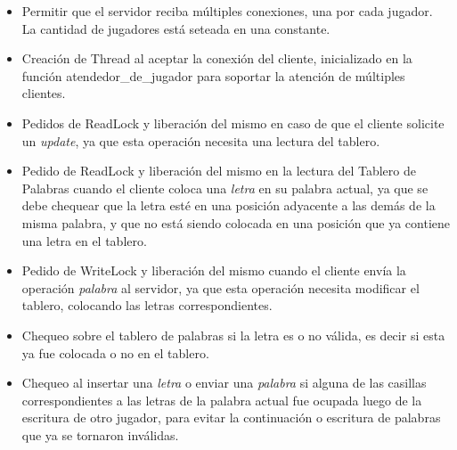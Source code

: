 \begin{itemize}
	\item Permitir que el servidor reciba múltiples conexiones, una por cada jugador.  La cantidad de jugadores está seteada en una constante.
	\item Creación de Thread al aceptar la conexión del cliente, inicializado en la función {\sc atendedor_de_jugador} para soportar la atención de múltiples clientes.
    \item Pedidos de ReadLock y liberación del mismo en caso de que el cliente solicite un {\it update}, ya que esta operación necesita una lectura del tablero.
    \item Pedido de ReadLock y liberación del mismo en la lectura del Tablero de Palabras cuando el cliente coloca una {\it letra} en su palabra actual, ya que se debe chequear que la letra esté en una posición adyacente a las demás de la misma palabra, y que no está siendo colocada en una posición que ya contiene una letra en el tablero.
    \item Pedido de WriteLock y liberación del mismo cuando el cliente envía la operación {\it palabra} al servidor, ya que esta operación necesita modificar el tablero, colocando las letras correspondientes.
    \item Chequeo sobre el tablero de palabras si la letra es o no válida, es decir si esta ya fue colocada o no en el tablero.
    \item Chequeo al insertar una {\it letra} o enviar una {\it palabra} si alguna de las casillas correspondientes a las letras de la palabra actual fue ocupada luego de la escritura de otro jugador, para evitar la continuación o escritura de palabras que ya se tornaron inválidas.
\end{itemize}
